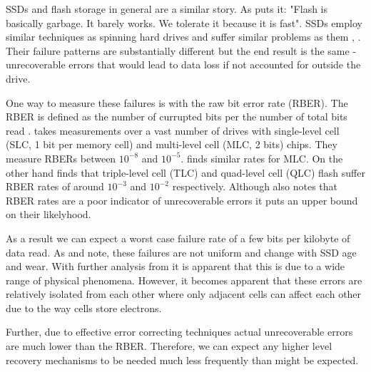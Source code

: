             SSDs and flash storage in general are a similar story. As
            \citeauthor{2D_RAID} puts it: "Flash is basically garbage. It
            barely works. We tolerate it because it is fast". SSDs employ
            similar techniques as spinning hard drives and suffer similar
            problems as them \cite{flash_large_scale},
            \cite{flash_reliability}. Their failure patterns are substantially
            different but the end result is the same - unrecoverable errors
            that would lead to data loss if not accounted for outside the
            drive.

            One way to measure these failures is with the raw bit error rate
            (RBER). The RBER is defined as the number of currupted bits per the
            number of total bits read \cite{flash_reliability}.
            \citeauthor{flash_reliability} takes measurements over a vast
            number of drives with single-level cell (SLC, 1 bit per memory
            cell) and multi-level cell (MLC, 2 bits) chips. They measure RBERs
            between $10^{-8}$ and $10^{-5}$. \citeauthor{bit_error_mlc} finds
            similar rates for MLC. On the other hand \citeauthor{bit_error_qlc}
            finds that triple-level cell (TLC) and quad-level cell (QLC) flash
            suffer RBER rates of around $10^{-3}$ and $10^{-2}$ respectively.
            Although \citeauthor{flash_reliability} also notes that RBER rates
            are a poor indicator of unrecoverable errors it puts an upper bound
            on their likelyhood.

            As a result we can expect a worst case failure rate of a few bits
            per kilobyte of data read. As \citeauthor{flash_reliability} and
            \citeauthor{flash_large_scale} note, these failures are not uniform
            and change with SSD age and wear. With further analysis from
            \citeauthor{flash_error_manual} it is apparent that this is due to
            a wide range of physical phenomena. However, it becomes apparent
            that these errors are relatively isolated from each other where
            only adjacent cells can affect each other due to the way cells
            store electrons.

            Further, due to effective error correcting techniques
            \cite{flash_reliability} \cite{bit_error_mlc} \cite{bit_error_qlc}
            \cite{flash_error_manual} actual unrecoverable errors are much
            lower than the RBER. Therefore, we can expect any higher level
            recovery mechanisms to be needed much less frequently than might be
            expected.

